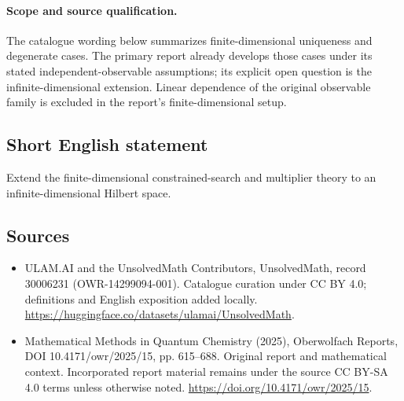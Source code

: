 \documentclass[11pt]{article}
\begin{document}
\paragraph{Scope and source qualification.}The catalogue wording below summarizes finite-dimensional uniqueness and degenerate cases. The primary report already develops those cases under its stated independent-observable assumptions; its explicit open question is the infinite-dimensional extension. Linear dependence of the original observable family is excluded in the report's finite-dimensional setup.
\subsection{Short English statement}
Extend the finite-dimensional constrained-search and multiplier theory to an infinite-dimensional Hilbert space.
\subsection{Sources}
\begin{itemize}
\item[\hypertarget{source:30006231:1}{S1}] ULAM.AI and the UnsolvedMath Contributors, UnsolvedMath, record 30006231 (OWR-14299094-001). Catalogue curation under CC BY 4.0; definitions and English exposition added locally.
\url{https://huggingface.co/datasets/ulamai/UnsolvedMath}.
\item[\hypertarget{source:30006231:2}{S2}] Mathematical Methods in Quantum Chemistry (2025), Oberwolfach Reports, DOI 10.4171/owr/2025/15, pp. 615--688. Original report and mathematical context. Incorporated report material remains under the source CC BY-SA 4.0 terms unless otherwise noted.
\url{https://doi.org/10.4171/owr/2025/15}.
\end{itemize}
\label{end:30006231}
\end{document}
